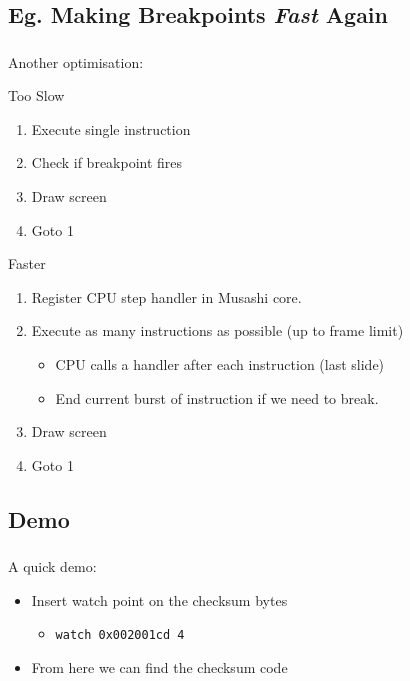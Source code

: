 \documentclass{beamer}
\begin{document}
\subsection{Eg. Making Breakpoints \emph{Fast} Again}
\begin{frame}[fragile]
\frametitle{\insertsubsection}


Another optimisation:
\vfill

\begin{block}{Too Slow}
\begin{enumerate}
\item Execute single instruction
\item Check if breakpoint fires
\item Draw screen
\item Goto 1
\end{enumerate}
\end{block}

\vfill

\begin{block}{Faster}
\begin{enumerate}
\item Register CPU step handler in Musashi core.
\item Execute as many instructions as possible (up to frame limit)
\begin{itemize}
\item CPU calls a handler after each instruction (last slide)
\item End current burst of instruction if we need to break.
\end{itemize}
\item Draw screen
\item Goto 1
\end{enumerate}
\end{block}
\vfill

\end{frame}

\subsection{Demo}
\begin{frame}[fragile]
\frametitle{\insertsubsection}


{\huge A quick demo:}

\begin{itemize}
\item Insert watch point on the checksum bytes
\begin{itemize}
\item {\tt watch 0x002001cd 4}
\end{itemize}
\item From here we can find the checksum code
\end{itemize}

\end{frame}
\end{document}
